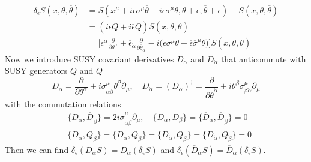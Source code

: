 \documentclass[12pt]{report}
\begin{document}
\begin{align}
\delta_{\epsilon} S(x, \theta, \overline{\theta}) &= S(x^{\mu} + i \epsilon \sigma^{\mu}\overline{\theta} + i \overline{\epsilon} \overline{\sigma}^{\mu} \theta, \theta + \epsilon, \overline{\theta} + \overline{\epsilon}) - S(x, \theta, \overline{\theta})\\
&= (i \epsilon Q + i \overline{\epsilon} \overline{Q}) S(x, \theta, \overline{\theta})\\
&= \Big[ \epsilon^{\alpha} \frac{\partial}{\partial \theta^{\alpha}} + \overline{\epsilon}_{\dot{\alpha}} \frac{\partial}{\partial \overline{\theta}_{\dot{\alpha}}} - i \big( \epsilon \sigma^{\mu} \overline{\theta} + \overline{\epsilon} \overline{\sigma}^{\mu} \theta \big)  \Big] S(x, \theta, \overline{\theta})
\end{align}
Now we introduce SUSY covariant derivatives $D_{\alpha}$ and $\overline{D}_{\dot{\alpha}}$ that anticommute with SUSY generators $Q$ and $\overline{Q}$
\begin{equation}
D_{\alpha} = \frac{\partial}{\partial \theta^{\alpha}} + i \sigma^{\mu}_{\alpha \dot{\beta}} \overline{\theta}^{\dot{\beta}} \partial_{\mu}, \quad 
\overline{D}_{\dot{\alpha}} = (D_{\alpha})^{\dag} = \frac{\partial}{\partial \overline{\theta}^{\dot{\alpha}}} + i \theta^{\beta} \sigma^{\mu}_{\beta \dot{\alpha}} \partial_{\mu}
\end{equation}
with the commutation relations
\begin{align*}
& \{ D_{\alpha}, \overline{D}_{\dot{\beta}}\} = 2i \sigma^{\mu}_{\alpha \dot{\beta}} \partial_{\mu}, \quad \{ D_{\alpha}, D_{\beta}\} = \{ \overline{D}_{\dot{\alpha}}, \overline{D}_{\dot{\beta}}\} = 0\\
& \{ D_{\alpha}, Q_{\beta} \} = \{ D_{\alpha}, \overline{Q}_{\dot{\beta}}\} = \{ \overline{D}_{\dot{\alpha}}, Q_{\beta} \} = \{ \overline{D}_{\dot{\alpha}}, \overline{Q}_{\dot{\beta}}\} = 0  
\end{align*}
Then we can find $\delta_{\epsilon} (D_{\alpha} S) = D_{\alpha} (\delta_{\epsilon} S)$ and $\delta_{\epsilon} (\overline{D}_{\dot{\alpha}} S) = \overline{D}_{\dot{\alpha}} (\delta_{\epsilon} S)$.
\end{document}

